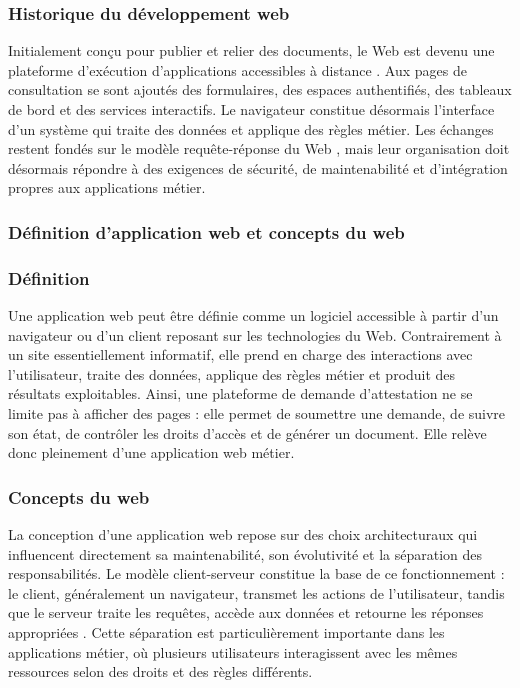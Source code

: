 \subsubsection{Historique du développement web}

Initialement conçu pour publier et relier des documents, le Web est devenu une
plateforme d'exécution d'applications accessibles à distance
\cite{w3c2004webarch}. Aux pages de consultation se sont ajoutés des formulaires,
des espaces authentifiés, des tableaux de bord et des services interactifs. Le
navigateur constitue désormais l'interface d'un système qui traite des données
et applique des règles métier. Les échanges restent fondés sur le modèle
requête-réponse du Web \cite{rfc9110}, mais leur organisation doit désormais
répondre à des exigences de sécurité, de maintenabilité et d'intégration propres
aux applications métier.

\subsubsection{Définition d'application web et concepts du web}

\subsubsection*{Définition}

Une application web peut être définie comme un logiciel accessible à partir d’un
navigateur ou d’un client reposant sur les technologies du Web. Contrairement à
un site essentiellement informatif, elle prend en charge des interactions avec
l’utilisateur, traite des données, applique des règles métier et produit des
résultats exploitables. Ainsi, une plateforme de demande d’attestation ne se
limite pas à afficher des pages : elle permet de soumettre une demande, de suivre
son état, de contrôler les droits d’accès et de générer un document. Elle relève
donc pleinement d’une application web métier.

\subsubsection*{Concepts du web}

La conception d’une application web repose sur des choix architecturaux qui
influencent directement sa maintenabilité, son évolutivité et la séparation des
responsabilités. Le modèle client-serveur constitue la base de ce fonctionnement :
le client, généralement un navigateur, transmet les actions de l’utilisateur,
tandis que le serveur traite les requêtes, accède aux données et retourne les
réponses appropriées \cite{mdn2026webworks}. Cette séparation est particulièrement
importante dans les applications métier, où plusieurs utilisateurs interagissent
avec les mêmes ressources selon des droits et des règles différents.

